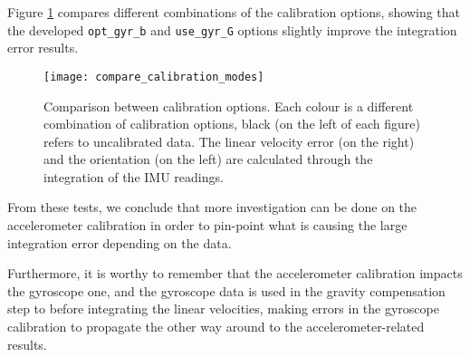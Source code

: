 Figure \ref{fig:comparecalibrationmodes} compares different combinations of the calibration options, showing that the developed \texttt{opt\_gyr\_b} and \texttt{use\_gyr\_G} options slightly improve the integration error results. 

\begin{figure}[h]
	\centering
	\texttt{[image: compare\_calibration\_modes]}
	\caption{Comparison between calibration options.  Each colour is a different combination of calibration options, black (on the left of each figure) refers to uncalibrated data. The linear velocity error (on the right) and the orientation (on the left) are calculated through the integration of the IMU readings.}
	\label{fig:comparecalibrationmodes}
\end{figure}

From these tests, we conclude that more investigation can be done on the accelerometer calibration in order to pin-point what is causing the large integration error depending on the data.

Furthermore, it is worthy to remember that the accelerometer calibration impacts the gyroscope one, and the gyroscope data is used in the gravity compensation step to before integrating the linear velocities, making errors in the gyroscope calibration to propagate the other way around to the accelerometer-related results.